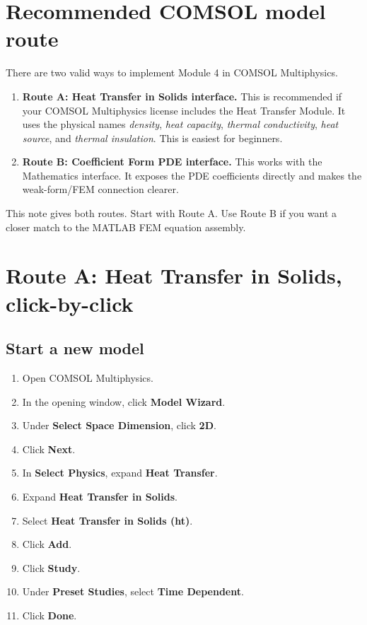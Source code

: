 \documentclass[11pt]{article}
\newcommand{\COMSOL}{COMSOL Multiphysics}
\newcommand{\comsol}{\COMSOL}
\newcommand{\menu}[1]{\textbf{#1}}
\newcommand{\module}{Module 4}
\begin{document}
\section{Recommended COMSOL model route}

There are two valid ways to implement \module{} in \comsol{}.

\begin{enumerate}
\item \textbf{Route A: Heat Transfer in Solids interface.} This is recommended if your \comsol{} license includes the Heat Transfer Module.  It uses the physical names \emph{density}, \emph{heat capacity}, \emph{thermal conductivity}, \emph{heat source}, and \emph{thermal insulation}.  This is easiest for beginners.
\item \textbf{Route B: Coefficient Form PDE interface.} This works with the Mathematics interface.  It exposes the PDE coefficients directly and makes the weak-form/FEM connection clearer.
\end{enumerate}

This note gives both routes.  Start with Route A.  Use Route B if you want a closer match to the MATLAB FEM equation assembly.

\section{Route A: Heat Transfer in Solids, click-by-click}

\subsection{Start a new model}
\begin{enumerate}
\item Open \comsol{}.
\item In the opening window, click \menu{Model Wizard}.
\item Under \menu{Select Space Dimension}, click \menu{2D}.
\item Click \menu{Next}.
\item In \menu{Select Physics}, expand \menu{Heat Transfer}.
\item Expand \menu{Heat Transfer in Solids}.
\item Select \menu{Heat Transfer in Solids (ht)}.
\item Click \menu{Add}.
\item Click \menu{Study}.
\item Under \menu{Preset Studies}, select \menu{Time Dependent}.
\item Click \menu{Done}.
\end{enumerate}
\end{document}
